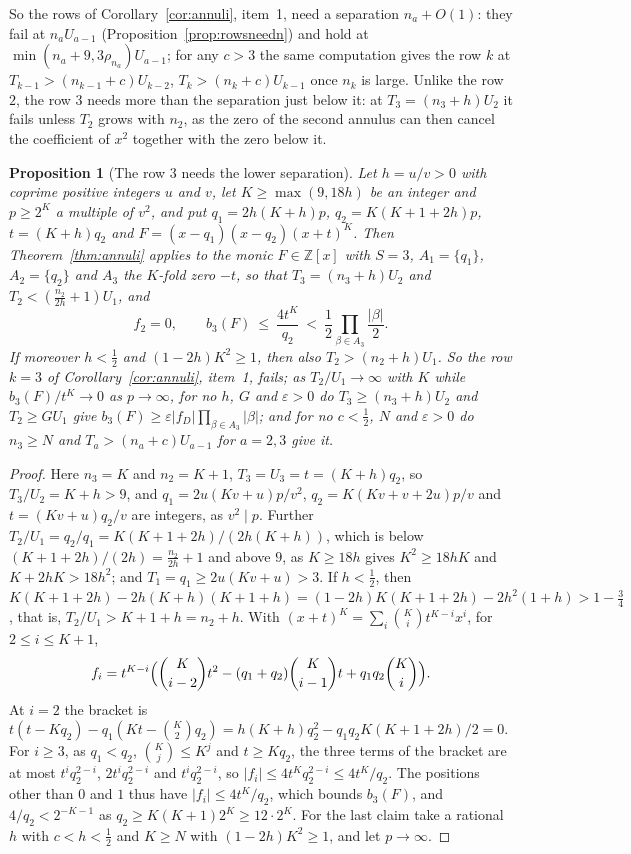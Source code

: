 \documentclass[11pt]{article}
\newtheorem{proposition}[theorem]{Proposition}
\begin{document}
So the rows of Corollary~\ref{cor:annuli}, item~1, need a separation
$n_a+O(1)$: they fail at $n_aU_{a-1}$ (Proposition~\ref{prop:rowsneedn}) and
hold at $\min(n_a+9,3\rho_{n_a})U_{a-1}$; for any $c>3$ the same computation gives the row $k$
at $T_{k-1}>(n_{k-1}+c)U_{k-2}$, $T_k>(n_k+c)U_{k-1}$ once $n_k$ is large.
Unlike the row $2$, the row $3$ needs more than the separation just below
it: at $T_3=(n_3+h)U_2$ it fails unless $T_2$ grows with $n_2$, as the zero
of the second annulus can then cancel the coefficient of $x^2$ together with
the zero below it.

\begin{proposition}[The row $3$ needs the lower separation]\label{prop:rowslower}
Let $h=u/v>0$ with coprime positive integers $u$ and $v$, let
$K\ge\max(9,18h)$ be an integer and $p\ge2^K$ a multiple of $v^2$, and put
$q_1=2h(K+h)p$, $q_2=K(K+1+2h)p$, $t=(K+h)q_2$ and
$F=(x-q_1)(x-q_2)(x+t)^K$.  Then Theorem~\ref{thm:annuli} applies to the
monic $F\in\mathbb Z[x]$ with $S=3$, $A_1=\{q_1\}$, $A_2=\{q_2\}$ and $A_3$
the $K$-fold zero $-t$, so that $T_3=(n_3+h)U_2$ and
$T_2<(\frac{n_2}{2h}+1)U_1$, and
\[
  f_2=0,\qquad b_3(F)\ \le\ \frac{4t^K}{q_2}\ <\ \frac12\prod_{\beta\in A_3}\frac{|\beta|}2 .
\]
If moreover $h<\frac12$ and $(1-2h)K^2\ge1$, then also $T_2>(n_2+h)U_1$.
So the row $k=3$ of Corollary~\ref{cor:annuli}, item~1, fails; as
$T_2/U_1\to\infty$ with $K$ while $b_3(F)/t^K\to0$ as $p\to\infty$, for no
$h$, $G$ and $\varepsilon>0$ do $T_3\ge(n_3+h)U_2$ and $T_2\ge GU_1$ give
$b_3(F)\ge\varepsilon|f_D|\prod_{\beta\in A_3}|\beta|$; and for no
$c<\frac12$, $N$ and $\varepsilon>0$ do $n_3\ge N$ and
$T_a>(n_a+c)U_{a-1}$ for $a=2,3$ give it.
\end{proposition}

\begin{proof}
Here $n_3=K$ and $n_2=K+1$, $T_3=U_3=t=(K+h)q_2$, so $T_3/U_2=K+h>9$, and
$q_1=2u(Kv+u)p/v^2$, $q_2=K(Kv+v+2u)p/v$ and $t=(Kv+u)q_2/v$ are integers,
as $v^2\mid p$.  Further $T_2/U_1=q_2/q_1=K(K+1+2h)/(2h(K+h))$, which is below
$(K+1+2h)/(2h)=\frac{n_2}{2h}+1$ and above $9$, as $K\ge18h$ gives $K^2\ge18hK$
and $K+2hK>18h^2$; and $T_1=q_1\ge2u(Kv+u)>3$.  If $h<\frac12$, then
$K(K+1+2h)-2h(K+h)(K+1+h)=(1-2h)K(K+1+2h)-2h^2(1+h)>1-\frac34$, that is,
$T_2/U_1>K+1+h=n_2+h$.  With $(x+t)^K=\sum_i\binom Kit^{K-i}x^i$,
for $2\le i\le K+1$,
\[
  f_i=t^{K-i}\Bigl(\binom K{i-2}t^2-(q_1+q_2)\binom K{i-1}t+q_1q_2\binom Ki\Bigr).
\]
At $i=2$ the bracket is $t(t-Kq_2)-q_1(Kt-\binom K2q_2)
=h(K+h)q_2^2-q_1q_2K(K+1+2h)/2=0$.  For $i\ge3$, as $q_1<q_2$,
$\binom Kj\le K^j$ and $t\ge Kq_2$, the three terms of the bracket are at most
$t^iq_2^{2-i}$, $2t^iq_2^{2-i}$ and $t^iq_2^{2-i}$, so $|f_i|\le4t^Kq_2^{2-i}\le4t^K/q_2$.
The positions other than $0$ and $1$ thus have $|f_i|\le4t^K/q_2$, which
bounds $b_3(F)$, and $4/q_2<2^{-K-1}$ as $q_2\ge K(K+1)2^K\ge12\cdot2^K$.
For the last claim take a rational $h$ with $c<h<\frac12$ and $K\ge N$
with $(1-2h)K^2\ge1$, and let $p\to\infty$.
\end{proof}
\end{document}
